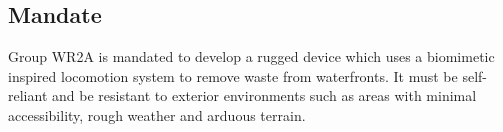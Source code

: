 \subsection{Mandate}

Group WR2A is mandated to develop a rugged device which uses a biomimetic inspired locomotion system to remove waste from waterfronts. It must be self-reliant and be resistant to exterior environments such as areas with minimal accessibility, rough weather and arduous terrain.
